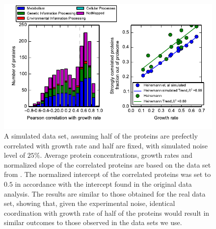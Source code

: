 \documentclass[a4paper]{article}
\begin{document}
\begin{figure}[H]
\begin{center}
\includegraphics[width=1\columnwidth]{SimulatedsummaryHistAndGr.pdf}
\caption{\label{fig:simulated}
A simulated data set, assuming half of the proteins are prefectly correlated with growth rate and half are fixed, with simulated noise level of $25\%$.
Average protein concentrations, growth rates and normalized slope of the correlated proteins are based on the data set from \cite{Heinemann2015}.
The normalized intercept of the correlated proteins was set to $0.5$ in accordance with the intercept found in the original data analysis.
The results are similar to those obtained for the real data set, showing that, given the experimental noise, identical coordination with growth rate of half of the proteins would result in similar outcomes to those observed in the data sets we use.}
\end{center}
\end{figure}
\end{document}
